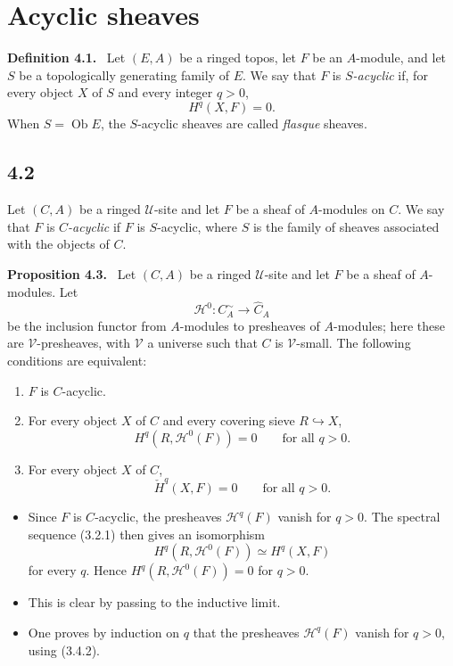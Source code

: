 \documentclass[11pt]{article}
\newcommand{\U}{\mathcal{U}}
\newcommand{\V}{\mathcal{V}}
\newcommand{\Hh}{\mathcal{H}}
\newcommand{\ob}{\operatorname{Ob}}
\newenvironment{statement}[1]{\par\medskip\noindent\textbf{#1.}\ }{\par\medskip}
\begin{document}
\section{Acyclic sheaves}

\begin{statement}{Definition 4.1}
Let $(E,A)$ be a ringed topos, let $F$ be an $A$-module, and let $S$ be a topologically generating family of $E$. We say that $F$ is \emph{$S$-acyclic} if, for every object $X$ of $S$ and every integer $q>0$,
\[
H^q(X,F)=0.
\]
When $S=\ob E$, the $S$-acyclic sheaves are called \emph{flasque} sheaves.
\end{statement}

\subsection*{4.2}
Let $(C,A)$ be a ringed $\U$-site and let $F$ be a sheaf of $A$-modules on $C$. We say that $F$ is \emph{$C$-acyclic} if $F$ is $S$-acyclic, where $S$ is the family of sheaves associated with the objects of $C$.

\begin{statement}{Proposition 4.3}
Let $(C,A)$ be a ringed $\U$-site and let $F$ be a sheaf of $A$-modules. Let
\[
\Hh^0:C^\sim_A\longrightarrow \widehat C_A
\]
be the inclusion functor from $A$-modules to presheaves of $A$-modules; here these are $\V$-presheaves, with $\V$ a universe such that $C$ is $\V$-small. The following conditions are equivalent:
\begin{enumerate}[label=(\roman*)]
\item $F$ is $C$-acyclic.
\item For every object $X$ of $C$ and every covering sieve $R\hookrightarrow X$,
\[
H^q(R,\Hh^0(F))=0\qquad\text{for all }q>0.
\]
\item For every object $X$ of $C$,
\[
\check H^q(X,F)=0\qquad\text{for all }q>0.
\]
\end{enumerate}
\end{statement}

\begin{itemize}
\item[(i) $\Rightarrow$ (ii)] Since $F$ is $C$-acyclic, the presheaves $\Hh^q(F)$ vanish for $q>0$. The spectral sequence (3.2.1) then gives an isomorphism
\[
H^q(R,\Hh^0(F))\simeq H^q(X,F)
\]
for every $q$. Hence $H^q(R,\Hh^0(F))=0$ for $q>0$.
\item[(ii) $\Rightarrow$ (iii)] This is clear by passing to the inductive limit.
\item[(iii) $\Rightarrow$ (i)] One proves by induction on $q$ that the presheaves $\Hh^q(F)$ vanish for $q>0$, using (3.4.2).
\end{itemize}
\end{document}
